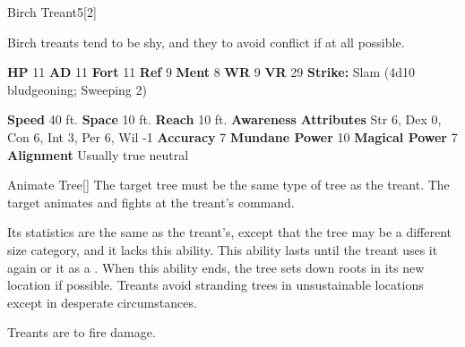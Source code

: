       
  \begin{monsubsection}{Birch Treant}{5}[2]
    \vspace{-1em}\vspace{-1em}
    \vspace{0em}

    
          Birch treants tend to be shy, and they to avoid conflict if at all possible.
        

    \begin{spellcontent}
      \begin{spelltargetinginfo}
        \pari \textbf{HP} 11 \monsep
          \textbf{AD} 11 \monsep
          \textbf{Fort} 11 \monsep
          \textbf{Ref} 9 \monsep
          \textbf{Ment} 8
        \pari \textbf{WR} 9 \monsep
        \textbf{VR} 29
        \pari \textbf{Strike:}
            Slam  (4d10 bludgeoning; Sweeping 2)
      \end{spelltargetinginfo}
    \end{spellcontent}
    \begin{monsterfooter}
      \pari \textbf{Speed} 40 ft. \monsep
        \textbf{Space} 10 ft. \monsep
        \textbf{Reach} 10 ft.
      \pari \textbf{Awareness} 
      \pari \textbf{Attributes}
        Str 6, Dex 0,
        Con 6, Int 3,
        Per 6, Wil -1
      \pari \textbf{Accuracy} 7 \monsep
        \textbf{Mundane Power} 10 \monsep
      \textbf{Magical Power} 7
      \pari \textbf{Alignment} Usually true neutral
    \end{monsterfooter}
  \end{monsubsection}
  \begin{freeability}{Animate Tree}[]
      The target tree must be the same type of tree as the treant.
        The target animates and fights at the treant's command.

        Its statistics are the same as the treant's, except that the tree may be a different size category, and it lacks this ability.
        This ability lasts until the treant uses it again or  it as a .
        When this ability ends, the tree sets down roots in its new location if possible.
        Treants avoid stranding trees in unsustainable locations except in desperate circumstances.
    \end{freeability}
  
        Treants are  to fire damage.
      
